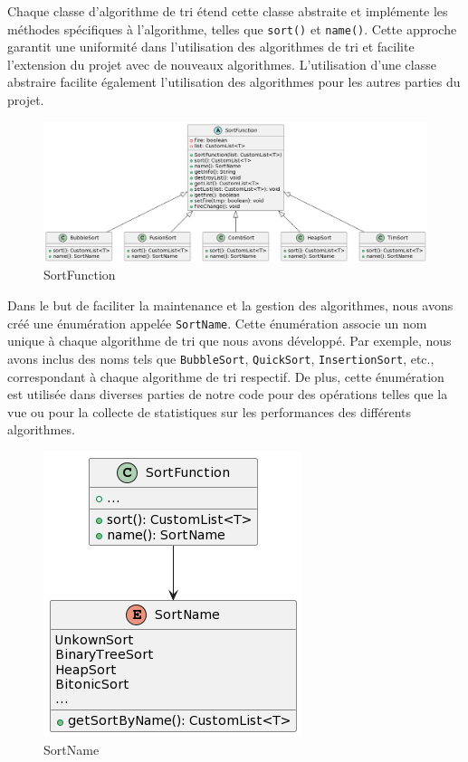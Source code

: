 \documentclass[a4paper,12pt]{article}
\begin{document}
Chaque classe d'algorithme de tri étend cette classe abstraite et implémente les méthodes spécifiques à l'algorithme, telles que \texttt{sort()} et \texttt{name()}. Cette approche garantit une uniformité dans l'utilisation des algorithmes de tri et facilite l'extension du projet avec de nouveaux algorithmes. L'utilisation d'une classe abstraire facilite également l'utilisation des algorithmes pour les autres parties du projet. 
\begin{figure}[h]
    \centering
    \includegraphics[width=1\textwidth]{sortFunction_UML.png}
    \caption{SortFunction}
    \label{fig:sortFunction}
\end{figure}
\newpage
 Dans le but de faciliter la maintenance et la gestion des algorithmes, nous avons créé une énumération appelée \texttt{SortName}. Cette énumération associe un nom unique à chaque algorithme de tri que nous avons développé.
Par exemple, nous avons inclus des noms tels que \texttt{BubbleSort}, \texttt{QuickSort}, \texttt{InsertionSort}, etc., correspondant à chaque algorithme de tri respectif. De plus, cette énumération est utilisée dans diverses parties de notre code pour des opérations telles que la vue ou pour la collecte de statistiques sur les performances des différents algorithmes.

\begin{figure}[h]
    \centering
    \includegraphics[height=0.5\textwidth]{SortName_UML.png}
    \caption{SortName}
    \label{fig:sortName}
\end{figure}
\end{document}
